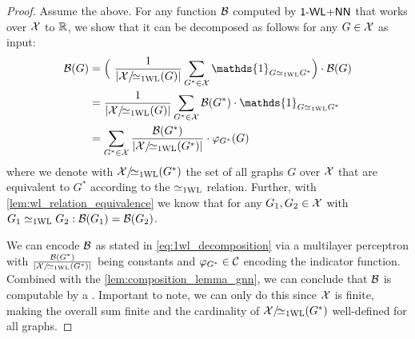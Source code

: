 \begin{proof}
    Assume the above. For any function $\mathcal{B}$ computed by $\textsf{1-WL+NN}$ that works over $\mathcal{X}$ to $\mathbb{R}$, we show that it can be decomposed as follows for any $G \in \mathcal{X}$ as input:
    \begin{align}\label{eq:1wl_decomposition}
        \cB(G) &= \Bigl( \ \frac{1}{|\cX/\!{\wliso}(G)|}\sum_{G^* \in \cX} \mathds{1}_{G \wliso G^*} \Bigr) \cdot \cB(G) \nonumber \\
        &= \frac{1}{|\cX/\!{\wliso}(G)|}\sum_{G^* \in \cX} \cB(G^*) \cdot \mathds{1}_{G \wliso G^*} \nonumber \\
        &= \sum_{G^* \in \cX} \frac{\cB(G^*)}{|\cX/\!{\wliso}(G^*)|}  \cdot \varphi_{G^*}(G)
    \end{align}
    where we denote with $\mathcal{X}/\!{\simeq_{\text{1WL}}}(G^*)$ the set of all graphs $G$ over $\mathcal{X}$ that are equivalent to $G^*$ according to the $\simeq_{\text{1WL}}$ relation. Further, with \cref{lem:wl_relation_equivalence} we know that for any $G_1, G_2 \in \mathcal{X}$ with $G_1 \simeq_{\text{1WL}} G_2: \mathcal{B}(G_1) = \mathcal{B}(G_2)$.
    
    We can encode $\mathcal{B}$ as stated in \autoref{eq:1wl_decomposition} via a multilayer perceptron with $\frac{\mathcal{B}(G^*)}{|\mathcal{X}/\!{\simeq_{\text{1WL}}}(G^*)|}$ being constants and $\varphi_{G^*} \in \mathcal{C}$ encoding the indicator function. Combined with the \autoref{lem:composition_lemma_gnn}, we can conclude that $\mathcal{B}$ is computable by a \gnn. Important to note, we can only do this since $\mathcal{X}$ is finite, making the overall sum finite and the cardinality of $\mathcal{X}/\!{\simeq_{\text{1WL}}}(G^*)$ well-defined for all graphs.
\end{proof}